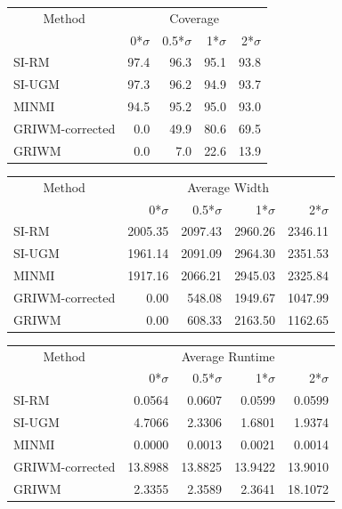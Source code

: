 \documentclass[
]{article}
\begin{document}
\begin{tabular}{lrrrr}
\toprule
\multicolumn{1}{c}{Method} & \multicolumn{4}{c}{Coverage} \\
 & 0*$\sigma$ & 0.5*$\sigma$ & 1*$\sigma$ & 2*$\sigma$\\
\midrule
SI-RM & 97.4 & 96.3 & 95.1 & 93.8\\
SI-UGM & 97.3 & 96.2 & 94.9 & 93.7\\
MINMI & 94.5 & 95.2 & 95.0 & 93.0\\
GRIWM-corrected & 0.0 & 49.9 & 80.6 & 69.5\\
GRIWM & 0.0 & 7.0 & 22.6 & 13.9\\
\bottomrule
\end{tabular}

\begin{tabular}{lrrrr}
\toprule
\multicolumn{1}{c}{Method} & \multicolumn{4}{c}{Average Width} \\
 & 0*$\sigma$ & 0.5*$\sigma$ & 1*$\sigma$ & 2*$\sigma$\\
\midrule
SI-RM & 2005.35 & 2097.43 & 2960.26 & 2346.11\\
SI-UGM & 1961.14 & 2091.09 & 2964.30 & 2351.53\\
MINMI & 1917.16 & 2066.21 & 2945.03 & 2325.84\\
GRIWM-corrected & 0.00 & 548.08 & 1949.67 & 1047.99\\
GRIWM & 0.00 & 608.33 & 2163.50 & 1162.65\\
\bottomrule
\end{tabular}

\begin{tabular}{lrrrr}
\toprule
\multicolumn{1}{c}{Method} & \multicolumn{4}{c}{Average Runtime} \\
 & 0*$\sigma$ & 0.5*$\sigma$ & 1*$\sigma$ & 2*$\sigma$\\
\midrule
SI-RM & 0.0564 & 0.0607 & 0.0599 & 0.0599\\
SI-UGM & 4.7066 & 2.3306 & 1.6801 & 1.9374\\
MINMI & 0.0000 & 0.0013 & 0.0021 & 0.0014\\
GRIWM-corrected & 13.8988 & 13.8825 & 13.9422 & 13.9010\\
GRIWM & 2.3355 & 2.3589 & 2.3641 & 18.1072\\
\bottomrule
\end{tabular}
\end{document}
